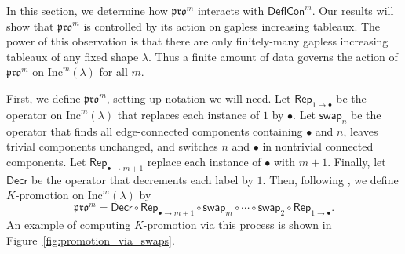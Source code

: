 \documentclass[12pt]{amsart}
\theoremstyle{definition}
\theoremstyle{remark}
\numberwithin{equation}{section}
\newcommand{\inc}{\ensuremath{\mathrm{Inc}}}
\newcommand{\pro}{\mathfrak{pro}}
\newcommand{\swap}{\ensuremath{\mathsf{swap}}}
\newcommand{\decr}{\ensuremath{\mathsf{Decr}}}
\newcommand{\rep}{\ensuremath{\mathsf{Rep}}}
\newcommand{\compress}{\ensuremath{\mathsf{DeflCon}}}
\begin{document}
In this section, we determine how $\pro^m$ interacts with $\compress^m$. Our results will show that $\pro^m$ is controlled by its action on gapless increasing tableaux. The power of this observation is that there are only finitely-many gapless increasing tableaux of any fixed shape $\lambda$. Thus a finite amount of data governs the action of $\pro^m$ on $\inc^m(\lambda)$ for all $m$.

First, we define $\pro^m$, setting up notation we will need. Let $\rep_{1 \rightarrow \bullet}$ be the operator on $\inc^m(\lambda)$ that replaces each instance of $1$ by $\bullet$. Let $\swap_n$ be the operator that finds all edge-connected components containing $\bullet$ and $n$, leaves trivial components unchanged, and switches $n$ and $\bullet$ in nontrivial connected components. Let $\rep_{\bullet \rightarrow m+1}$ replace each instance of $\bullet$ with $m+1$. Finally, let $\decr$ be the operator that decrements each label by $1$. Then, following \cite{Pechenik}, we define $K$-promotion on $\inc^m(\lambda)$ by 
\begin{equation}\label{eq:kprodef2}
\pro^m = \decr \circ \rep_{\bullet \rightarrow m+1} \circ \swap_m \circ \cdots \circ \swap_2 \circ \rep_{1 \rightarrow \bullet}.
\end{equation}
An example of computing $K$-promotion via this process is shown in Figure~\ref{fig:promotion_via_swaps}.
 
\end{document}
